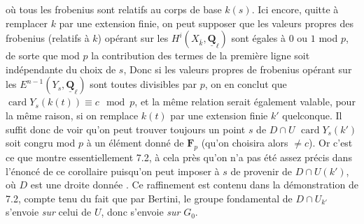 \documentclass[11pt,a4paper]{article}
\begin{document}
où tous les frobenius sont relatifs au corps de base $k(s)$. Ici encore, quitte à
remplacer $k$ par une extension finie, on peut supposer que les valeurs propres
 des frobenius (relatifs à $k$) opérant sur les
$H^i(X_{\bar k}, \underline{\mathbf{Q}}_\ell)$  sont égales à $0$ ou $1$ mod $p$, de sorte que mod $p$ la contribution
des termes de la première ligne soit indépendante du choix de $s$, 
Donc si les valeurs propres de frobenius opérant sur les $E^{n-1}(Y_s,
\underline{\mathbf{Q}}_\ell)$ sont toutes divisibles par $p$, on en conclut que
$\operatorname{card} Y_s(k(t)) \equiv c \mod p$, et la même relation serait
également valable, pour la même raison, si on remplace $k(t)$ par une extension
finie $k'$ quelconque. Il suffit donc de voir qu'on peut trouver toujours un point
$s$ de $D \cap U$ 
$\operatorname{card} Y_s(k')$ soit congru mod $p$ à un élément donné de
$\mathbf{F}_p$ (qu'on choisira alors $\neq c$). Or c'est ce que montre
essentiellement 7.2, à cela près qu'on n'a pas été assez précis dans l'énoncé de ce
corollaire puisqu'on peut imposer à $s$ de provenir de $D \cap U(k')$, où $D$ est
une droite donnée  . Ce raffinement est
contenu dans la démonstration de 7.2, compte tenu du fait que par Bertini, le groupe
fondamental de $D \cap U_{k'}$ s'envoie \emph{sur} celui de $U$, donc s'envoie
\emph{sur} $G_0$.
\end{document}
